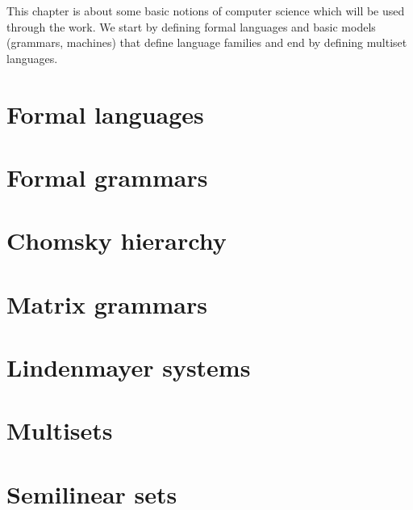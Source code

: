 This chapter is about some basic notions of computer science which will be used through the work. We start by defining formal languages and basic models (grammars, machines) that define language families and end by defining multiset languages.

\section{Formal languages} %
\label{sec:formal_languages}



\section{Formal grammars} %
\label{sec:formal_grammars}



\section{Chomsky hierarchy} %
\label{sec:chomsky_hierarchy}



\section{Matrix grammars} %
\label{sec:matrix_grammars}



\section{Lindenmayer systems} %
\label{sec:lindenmayer_systems}



\section{Multisets} %
\label{sec:multisets}



\section{Semilinear sets} %
\label{sec:semilinear_sets}


